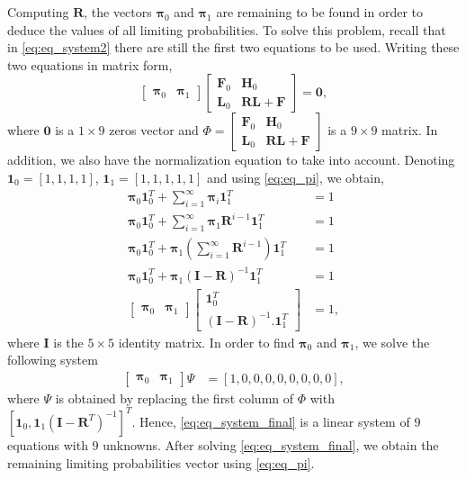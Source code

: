 \documentclass[sigconf,draft]{acmart}
\begin{document}
Computing $\bm{R}$, the vectors $\bm{\pi}_0$ and $\bm{\pi}_1$ are remaining to be found in order to deduce the values of all limiting probabilities. To solve this problem, recall that in \eqref{eq:eq_system2} there are still the first two equations to be used. Writing these two equations in matrix form,
\begin{equation}
  \label{eq:eq_finding_pi0_pi1_1}
  \left[\begin{array}{cc}
  \bm{\pi}_0 & \bm{\pi}_1
  \end{array}\right]\left[\begin{array}{cc}
  \bm{F}_0 & \bm{H}_0\\
  \bm{L}_0 & \bm{RL}+\bm{F}
  \end{array}\right]=\bm{0},
\end{equation}
where $\bm{0}$ is a $1 \times 9$ zeros vector and $\Phi=\left[\begin{array}{cc}
\bm{F}_0 & \bm{H}_0\\
\bm{L}_0 & \bm{RL}+\bm{F}
\end{array}\right]$ is a $9 \times 9$ matrix. In addition, we also have the normalization equation to take into account. Denoting $\bm{1}_0=[1, 1, 1, 1]$, $\bm{1}_1=[1, 1, 1, 1, 1]$ and using \eqref{eq:eq_pi}, we obtain,
\begin{align}
  \label{eq:eq_norm}
  \bm{\pi}_0\bm{1}_0^T + \sum_{i=1}^\infty \bm{\pi}_i\bm{1}_1^T &= 1 \\
  \bm{\pi}_0\bm{1}_0^T + \sum_{i=1}^\infty \bm{\pi}_1\bm{R}^{i-1}\bm{1}_1^T &= 1 \\
  \bm{\pi}_0\bm{1}_0^T + \bm{\pi}_1(\sum_{i=1}^\infty \bm{R}^{i-1})\bm{1}_1^T &= 1 \\
  \bm{\pi}_0\bm{1}_0^T + \bm{\pi}_1(\bm{I}-\bm{R})^{-1}\bm{1}_1^T &= 1 \\
  \left[\begin{array}{cc}
  \bm{\pi}_0 & \bm{\pi}_1
  \end{array}\right]\left[\begin{array}{c}
  \bm{1}_0^T \\
  \left(\bm{I}-\bm{R}\right)^{-1}.\bm{1}_1^T
  \end{array}\right] &= 1,
\end{align}
where $\bm{I}$ is the $5 \times 5$ identity matrix. In order to find $\bm{\pi}_0$ and $\bm{\pi}_1$, we solve the following system 
\begin{align}
\label{eq:eq_system_final}
\left[\begin{array}{cc}
\bm{\pi}_0 & \bm{\pi}_1
\end{array}\right]\Psi &= \left[1, 0, 0, 0, 0, 0, 0, 0, 0\right],
\end{align}
where $\Psi$ is obtained by replacing the first column of $\Phi$ with $[\bm{1}_0, \bm{1}_1(\bm{I}-\bm{R}^T)^{-1}]^T$. Hence, \eqref{eq:eq_system_final} is a linear system of $9$ equations with $9$ unknowns. After solving \eqref{eq:eq_system_final}, we obtain the remaining limiting probabilities vector using \eqref{eq:eq_pi}.
\end{document}
